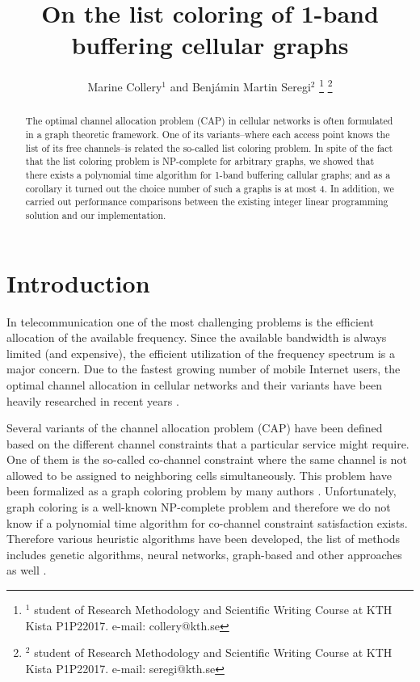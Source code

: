 \documentclass[letterpaper, 10 pt, conference]{ieeeconf}  %
\title{\LARGE \bf
On the list coloring of 1-band buffering cellular graphs
}
\author{Marine Collery$^{1}$ and Benjámin Martin Seregi$^{2}$%
\thanks{$^{1}$ student of Research Methodology and Scientific Writing Course at KTH Kista P1P22017. e-mail: collery@kth.se}%
\thanks{$^{2}$ student of Research Methodology and Scientific Writing Course at KTH Kista P1P22017. e-mail: seregi@kth.se}%
}
\begin{document}
\maketitle
\thispagestyle{fancy}
\fancyhf{}

\begin{abstract}
The optimal channel allocation problem (CAP) in cellular networks is often formulated in a graph theoretic framework. One of its variants\---where each access point knows the list of its free channels\---is related the so-called list coloring problem. In spite of the fact that the list coloring problem is NP-complete for arbitrary graphs, we showed that there exists a polynomial time algorithm for 1-band buffering callular graphs; and as a corollary it turned out the choice number of such a graphs is at most 4. In addition, we carried out performance comparisons between the existing integer linear programming solution and our implementation.
\end{abstract}

\section{Introduction}

In telecommunication one of the most challenging problems is the efficient allocation of the available frequency. Since the available bandwidth is always limited (and expensive), the efficient utilization of the frequency spectrum is a major concern. Due to the fastest growing number of mobile Internet users, the optimal channel allocation in cellular networks and their variants have been heavily researched in recent years \cite{Audhya:2011:SCA:1988563.1988571}.

Several variants of the channel allocation problem (CAP) have been defined based on the different channel constraints that a particular service might require. One of them is the so-called co-channel constraint where the same channel is not allowed to be assigned to neighboring cells simultaneously. This problem have been formalized as a graph coloring problem by many authors \cite{1456167}. Unfortunately, graph coloring is a well-known NP-complete problem \cite{Kar72} and therefore we do not know if a polynomial time algorithm for co-channel constraint satisfaction exists. Therefore various heuristic algorithms have been developed, the list of methods includes genetic algorithms, neural networks, graph-based and other approaches as well \cite{Audhya:2011:SCA:1988563.1988571}.
\end{document}
